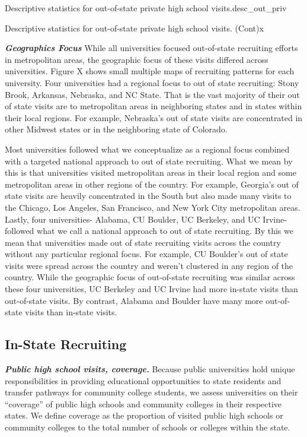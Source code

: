 \documentclass[twoside]{article}
\begin{document}
\begin{lscape-env}{Descriptive statistics for out-of-state private high school visits.}{desc_out_priv}
  
\end{lscape-env}

 \begin{lscape-env}{Descriptive statistics for out-of-state private high school visits. (Cont)}{x}
  
\end{lscape-env}

\textbf{\textit{Geographics Focus}} While all universities focused out-of-state recruiting efforts in metropolitan areas, the geographic focus of these visits differed across universities. Figure X shows small multiple maps of recruiting patterns for each university. Four universities had a regional focus to out of state recruiting: Stony Brook, Arkansas, Nebraska, and NC State. That is the vast majority of their out of state visits are to metropolitan areas in neighboring states and in states within their local regions. For example, Nebraska's out of state visits are concentrated in other Midwest states or in the neighboring state of Colorado.

Most universities followed what we conceptualize as a regional focus combined with a targeted national approach to out of state recruiting. What we mean by this is that universities visited metropolitan areas in their local region and some metropolitan areas in other regions of the country. For example, Georgia's out of state visits are heavily concentrated in the South but also made many visits to the Chicago, Los Angeles, San Francisco, and New York City metropolitan areas. Lastly, four universities- Alabama, CU Boulder, UC Berkeley, and UC Irvine- followed what we call a national approach to out of state recruiting. By this we mean that universities made out of state recruiting visits across the country without any particular regional focus. For example, CU Boulder's out of state visits were spread across the country and weren't clustered in any region of the country.  While the geographic focus of out-of-state recruiting was similar across these four universities, UC Berkeley and UC Irvine had more in-state visits than out-of-state visits. By contrast, Alabama and Boulder have many more out-of-state visits than in-state visits.

\subsection*{In-State Recruiting}
\textbf{\textit{Public high school visits, coverage.}} Because public universities hold unique responsibilities in providing educational opportunities to state residents and transfer pathways for community college students, we assess universities on their “coverage” of public high schools and community colleges in their respective states. We define coverage as the proportion of visited public high schools or community colleges to the total number of schools or colleges within the state.
\end{document}
